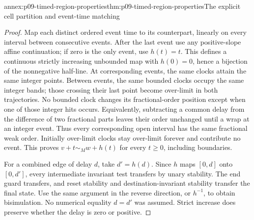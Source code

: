 \begin{annexitem}{annex:p09-timed-region-properties}{thm:p09-timed-region-properties}{The explicit cell partition and event-time matching}
\begin{proof}
Map each distinct ordered event time to its counterpart, linearly on
every interval between consecutive events. After the last event use any
positive-slope affine continuation; if zero is the only event, use
\(h(t)=t\). This defines a continuous strictly increasing unbounded
map with \(h(0)=0\), hence a bijection of the nonnegative half-line.
At corresponding events, the same clocks attain the same integer points.
Between events, the same bounded clocks occupy the same integer bands;
those crossing their last point become over-limit in both trajectories.
No bounded clock changes its fractional-order position except when one
of those integer hits occurs. Equivalently, subtracting a common delay
from the difference of two fractional parts leaves their order unchanged
until a wrap at an integer event. Thus every corresponding open interval
has the same fractional weak order. Initially over-limit clocks stay
over-limit forever and contribute no event. This proves
\(v+t\sim_Mw+h(t)\) for every \(t\geq0\), including boundaries.

For a combined edge of delay \(d\), take \(d'=h(d)\). Since \(h\)
maps \([0,d]\) onto \([0,d']\), every intermediate invariant test
transfers by unary stability. The end guard transfers, and reset stability
and destination-invariant stability transfer the final state. Use the same
argument in the reverse direction, or \(h^{-1}\), to obtain bisimulation.
No numerical equality \(d=d'\) was assumed. Strict increase does preserve
whether the delay is zero or positive.
\end{proof}
\end{annexitem}

